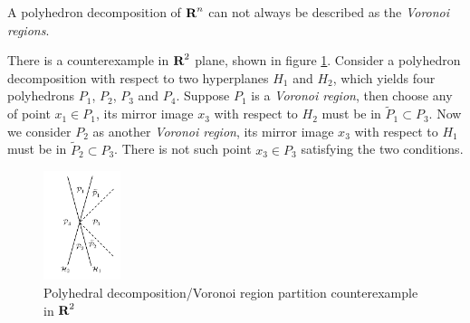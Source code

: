 \documentclass[12pt]{article}
\begin{document}
\begin{solution}[2.9(c)]

	A polyhedron decomposition of ${\mbox{\bf R}}^n$ can not always be described as the \textit{Voronoi regions}.

	There is a counterexample in ${\mbox{\bf R}}^2$ plane, shown in figure \ref{fig:-figures-hw1-29-png}.
	Consider a polyhedron decomposition with respect to two hyperplanes $H_1$ and $H_2$, which yields four polyhedrons $P_1$, $P_2$, $P_3$ and $P_4$.
	Suppose $P_1$ is a \textit{Voronoi region}, then choose any of point $x_1\in P_1$, its mirror image $x_3$ with respect to $H_2$ must be in $\tilde{P}_1\subset P_3$.
	Now we consider $P_2$ as another \textit{Voronoi region}, its mirror image $x_3$ with respect to $H_1$ must be in $\tilde{P}_2\subset P_3$. There is not such point $x_3\in P_3$ satisfying the two conditions.
	\begin{figure}[htpb]
		\centering
		\includegraphics[width=0.2\textwidth]{../figures/hw1-29.png}
		\caption{Polyhedral decomposition/Voronoi region partition counterexample in ${\mbox{\bf R}}^2$}
		\label{fig:-figures-hw1-29-png}
	\end{figure}
	
\end{solution}
\end{document}
